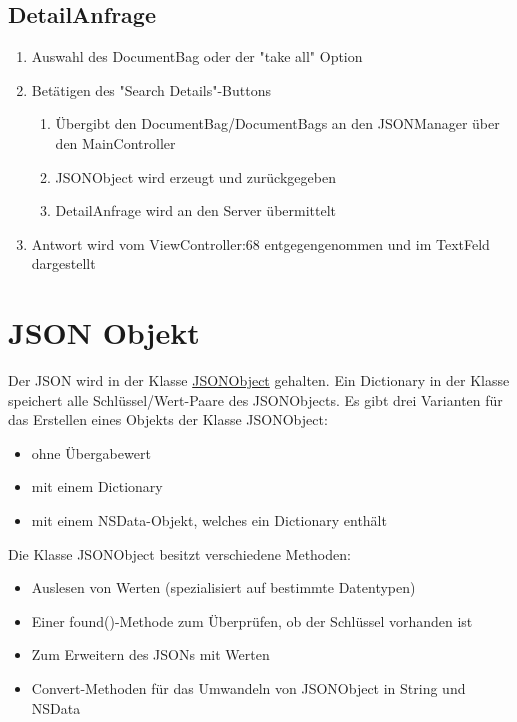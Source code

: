 \subsection{DetailAnfrage}
    \begin{enumerate}
      \item Auswahl des DocumentBag oder der "take all" Option
      \item Betätigen des "Search Details"-Buttons
	\begin{enumerate}
	  \item Übergibt den DocumentBag/DocumentBags an den JSONManager über den MainController
	  \item JSONObject wird erzeugt und zurückgegeben
	  \item DetailAnfrage wird an den Server übermittelt
	\end{enumerate}
      \item Antwort wird vom ViewController:68 entgegengenommen und im TextFeld dargestellt
    \end{enumerate}

\pagebreak
\section{JSON Objekt}

Der JSON wird in der Klasse \href{https://github.com/SECH-Tag-EEXCESS-Browser/iOSX-App/blob/master/Team%20Content/Demos/JSON/Sech/Sech/Json.swift}{JSONObject} 
gehalten. Ein Dictionary in der Klasse speichert alle Schlüssel/Wert-Paare des JSONObjects.
Es gibt drei Varianten für das Erstellen eines Objekts der Klasse JSONObject:
\begin{itemize}
\item ohne Übergabewert
\item mit einem Dictionary
\item mit einem NSData-Objekt, welches ein Dictionary enthält
\end{itemize}

Die Klasse JSONObject besitzt verschiedene Methoden:
\begin{itemize}
\item Auslesen von Werten (spezialisiert auf bestimmte Datentypen)
\item Einer found()-Methode zum Überprüfen, ob der Schlüssel vorhanden ist
\item Zum Erweitern des JSONs mit Werten
\item Convert-Methoden für das Umwandeln von JSONObject in String und NSData
\end{itemize}

